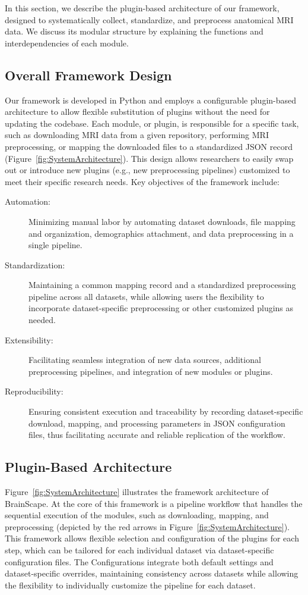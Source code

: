 In this section, we describe the plugin-based architecture of our framework, designed to systematically 
collect, standardize, and preprocess anatomical MRI data. We discuss its modular structure by explaining 
the functions and interdependencies of each module.


\subsection{Overall Framework Design}

Our framework is developed in Python and employs a configurable plugin-based architecture to allow flexible 
substitution of plugins without the need for updating the codebase. Each module, 
or plugin, is responsible for a specific task, such as downloading MRI data from a given repository, 
performing MRI preprocessing, or mapping the downloaded files to a standardized JSON record (Figure~\ref{fig:SystemArchitecture}).
This design allows researchers to easily swap out or introduce new plugins (e.g., new preprocessing pipelines) customized to meet their specific research needs.
Key objectives of the framework include: 
\begin{description}
    \item[Automation:] Minimizing manual labor by automating dataset downloads, file mapping and organization, demographics attachment, and data preprocessing in a single pipeline.
    \item[Standardization:] Maintaining a common mapping record and a standardized preprocessing pipeline across all datasets, while allowing users the flexibility to incorporate dataset-specific preprocessing or other customized plugins as needed.
    \item[Extensibility:] Facilitating seamless integration of new data sources, additional preprocessing pipelines, and integration of new modules or plugins. 
    \item[Reproducibility:] Ensuring consistent execution and traceability by recording dataset-specific download, mapping, and processing parameters in JSON configuration files, thus facilitating accurate and reliable replication of the workflow.
\end{description}


\subsection{Plugin-Based Architecture}

Figure~\ref{fig:SystemArchitecture} illustrates the framework architecture of BrainScape. 
At the core of this framework is a pipeline workflow that handles the sequential execution of the modules, 
such as downloading, mapping, and preprocessing (depicted by the red arrows in Figure~\ref{fig:SystemArchitecture}). 
This framework allows flexible selection and configuration of the plugins for each step, which can be tailored for 
each individual dataset via dataset-specific configuration files.
The Configurations integrate both default settings and dataset-specific overrides, maintaining consistency 
across datasets while allowing the flexibility to individually customize the pipeline for each dataset.

